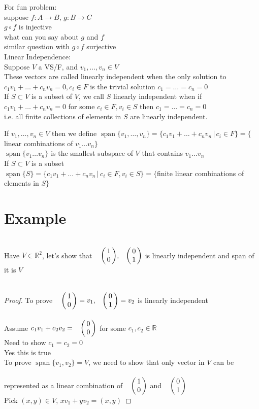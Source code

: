\documentclass[11pt]{article}
\DeclareMathOperator{\Span}{span}
\begin{document}
\doublespacing
For fun problem:\\
suppose $f: A\rightarrow B$, $g: B\rightarrow C$\\
$g\circ f$ is injective\\
what can you say about $g$ and $f$\\
similar question with $g\circ f$ surjective\\

Linear Independence:\\
Suppose $V$ a VS/F, and $v_1,\ldots,v_n \in V$\\
These vectors are called linearly independent when the only solution to $c_1v_1+\ldots+c_nv_n=0, c_i\in F$ is the trivial solution $c_1=\ldots=c_n=0$\\
If $S\subset V$ is a subset of $V$, we call $S$ linearly independent when if $c_1v_1+\ldots+c_nv_n=0$ for some $c_i\in F, v_i\in S$ then $c_1=\ldots=c_n=0$\\
i.e. all finite collections of elements in $S$ are linearly independent.

If $v_1,\ldots,v_n\in V$ then we define $\Span\{v_1,\ldots,v_n\}=\{c_1v_1+\ldots+c_nv_n\,|\,c_i\in F\}=\{$linear combinations of $v_1\ldots v_n\}$\\
$\Span\{v_1\ldots v_n\}$ is the smallest subspace of $V$ that contains $v_1\ldots v_n$\\

If $S\subset V$ is a subset\\
$\Span\{S\}=\{c_1v_1+\ldots+c_nv_n\,|\,c_i\in F, v_i\in S\}=\{$finite linear combinations of elements in $S\}$

\section*{Example}
Have $V\in\mathbb{R}^2$, let's show that $\bordermatrix{~ & \cr &1\cr &0},\bordermatrix{~ & \cr &0\cr &1}$ is linearly independent and span of it is $V$\\
\begin{proof}
	
	To prove $\bordermatrix{~ & \cr &1\cr &0}=v_1,\bordermatrix{~ & \cr &0\cr &1}=v_2$ is linearly independent\\
	Assume $c_1v_1+c_2v_2=\bordermatrix{~ & \cr &0\cr &0}$ for some $c_1,c_2\in \mathbb{R}$\\
	Need to show $c_1=c_2=0$\\
	Yes this is true\\
	To prove $\Span\{v_1,v_2\}=V$, we need to show that only vector in $V$ can be represented as a linear combination of $\bordermatrix{~ & \cr &1\cr &0}$ and $\bordermatrix{~ & \cr &0\cr &1}$\\
	Pick $(x,y)\in V$, $xv_1+yv_2=(x,y)$
\end{proof}
\end{document}
